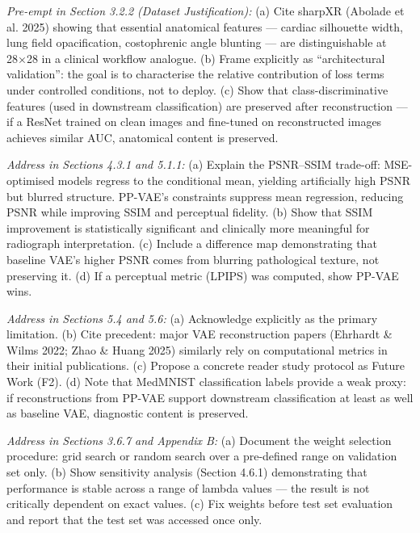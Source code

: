 \documentclass[12pt, a4paper]{article}
\begin{document}
\begin{description}[style=nextline, leftmargin=0pt]

\item[\color{critred}C1 — Resolution triviality]
\textit{Pre-empt in Section 3.2.2 (Dataset Justification):}
(a) Cite sharpXR (Abolade et al. 2025) showing that essential
anatomical features — cardiac silhouette width, lung field
opacification, costophrenic angle blunting — are distinguishable
at 28×28 in a clinical workflow analogue.
(b) Frame explicitly as ``architectural validation'': the goal is
to characterise the relative contribution of loss terms under
controlled conditions, not to deploy.
(c) Show that class-discriminative features (used in downstream
classification) are preserved after reconstruction — if a ResNet
trained on clean images and fine-tuned on reconstructed images
achieves similar AUC, anatomical content is preserved.

\item[\color{critred}C2 — Baseline VAE beats PP-VAE on PSNR]
\textit{Address in Sections 4.3.1 and 5.1.1:}
(a) Explain the PSNR–SSIM trade-off: MSE-optimised models
regress to the conditional mean, yielding artificially high PSNR
but blurred structure. PP-VAE's constraints suppress mean regression,
reducing PSNR while improving SSIM and perceptual fidelity.
(b) Show that SSIM improvement is statistically significant and
clinically more meaningful for radiograph interpretation.
(c) Include a difference map demonstrating that baseline VAE's
higher PSNR comes from blurring pathological texture, not
preserving it.
(d) If a perceptual metric (LPIPS) was computed, show PP-VAE wins.

\item[\color{critred}C3 — No radiologist validation]
\textit{Address in Sections 5.4 and 5.6:}
(a) Acknowledge explicitly as the primary limitation.
(b) Cite precedent: major VAE reconstruction papers (Ehrhardt
\& Wilms 2022; Zhao \& Huang 2025) similarly rely on computational
metrics in their initial publications.
(c) Propose a concrete reader study protocol as Future Work (F2).
(d) Note that MedMNIST classification labels provide a weak proxy:
if reconstructions from PP-VAE support downstream classification
at least as well as baseline VAE, diagnostic content is preserved.

\item[\color{critred}C4 — Arbitrary loss weights]
\textit{Address in Sections 3.6.7 and Appendix B:}
(a) Document the weight selection procedure: grid search or random
search over a pre-defined range on validation set only.
(b) Show sensitivity analysis (Section 4.6.1) demonstrating
that performance is stable across a range of lambda values
— the result is not critically dependent on exact values.
(c) Fix weights before test set evaluation and report that the
test set was accessed once only.


\end{description}
\end{document}
